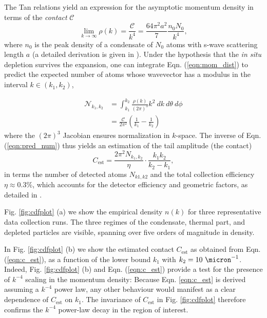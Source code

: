 The Tan relations yield an expression for the asymptotic momentum density in terms of the \emph{contact} $\mathcal{C}$
\begin{equation}
\lim_{k\rightarrow\infty}\rho(k) = \frac{\mathcal{C}}{k^4}=\frac{64\pi^2a^2}{7} \frac{n_0 N_0}{k^4},
\label{eqn:mom_dist}
\end{equation}
where $n_0$ is the peak density of a condensate of $N_0$ atoms with s-wave scattering length $a$ \cite{tan08_energetics,tan08_momentum} (a detailed derivation is given in \cite{SOM}). Under the hypothesis that the \emph{in situ} depletion survives the expansion, one can integrate Eqn. (\ref{eqn:mom_dist}) to predict the expected number of atoms whose wavevector has a modulus in the interval $k\in (k_1, k_2)$, 

\begin{align}
\mathcal{N}_{k_1,k_2} &=\int_{k_1}^{k_2} \frac{\rho(k)}{(2\pi)^3}k^2~dk~d\theta~d\phi\\
		&=\frac{\mathcal{C}}{2\pi^2}\left(\frac{1}{k_1}-\frac{1}{k_2}\right)
\label{eqn:pred_num}
\end{align}
where the $(2\pi)^3$ Jacobian ensures normalization in $k$-space. The inverse of Eqn. (\ref{eqn:pred_num}) thus yields an estimation of the tail amplitude (the contact)
\begin{equation}
C_\textrm{est} = \frac{2\pi^2N_{k_1,k_2}}{\eta}\cdot \frac{k_1 k_2 }{k_2-k_1},
\label{eqn:c_est}
\end{equation}
in terms the number of detected atoms $N_{k1,k2}$ and the total collection efficiency $\eta\approx0.3\%$, which accounts for the detector efficiency and geometric factors, as detailed in \cite{SOM}. 

Fig. \ref{fig:cdfplot} (a) we show the empirical density $n(k)$ for three representative data collection runs. The three regimes of the condensate, thermal part, and depleted particles are visible, spanning over five orders of magnitude in density. 

In Fig. \ref{fig:cdfplot} (b) we show the estimated contact $C_\textrm{est}$ as obtained from Eqn. (\ref{eqn:c_est}), as a function of the lower bound $k_1$ with $k_2=10~\micron^{-1}$. Indeed, Fig. \ref{fig:cdfplot} (b) and Eqn. (\ref{eqn:c_est}) provide a test for the presence of $k^{-4}$ scaling in the momentum density: Because Eqn. \ref{eqn:c_est} is derived assuming a $k^{-4}$ power law, any other behaviour would manifest as a clear dependence of $C_\textrm{est}$ on $k_1$. The invariance of $C_\textrm{est}$ in Fig. \ref{fig:cdfplot} therefore confirms the $k^{-4}$ power-law decay in the region of interest. 

